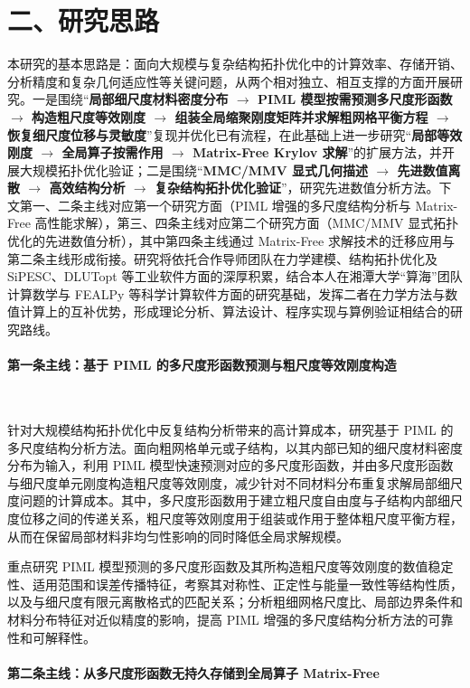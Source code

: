 \documentclass[zihao=-4,a4paper]{ctexart}
\newcommand{\arrowto}{ $\rightarrow$ }
\begin{document}
\section*{二、研究思路}

本研究的基本思路是：面向大规模与复杂结构拓扑优化中的计算效率、存储开销、分析精度和复杂几何适应性等关键问题，从两个相对独立、相互支撑的方面开展研究。一是围绕``\textbf{局部细尺度材料密度分布\arrowto PIML 模型按需预测多尺度形函数\arrowto 构造粗尺度等效刚度\arrowto 组装全局缩聚刚度矩阵并求解粗网格平衡方程\arrowto 恢复细尺度位移与灵敏度}''复现并优化已有流程，在此基础上进一步研究``\textbf{局部等效刚度\arrowto 全局算子按需作用\arrowto Matrix-Free Krylov 求解}''的扩展方法，并开展大规模拓扑优化验证；二是围绕``\textbf{MMC/MMV 显式几何描述\arrowto 先进数值离散\arrowto 高效结构分析\arrowto 复杂结构拓扑优化验证}''，研究先进数值分析方法。下文第一、二条主线对应第一个研究方面（PIML 增强的多尺度结构分析与 Matrix-Free 高性能求解），第三、四条主线对应第二个研究方面（MMC/MMV 显式拓扑优化的先进数值分析），其中第四条主线通过 Matrix-Free 求解技术的迁移应用与第二条主线形成衔接。研究将依托合作导师团队在力学建模、结构拓扑优化及 SiPESC、DLUTopt 等工业软件方面的深厚积累，结合本人在湘潭大学``算海''团队计算数学与 FEALPy 等科学计算软件方面的研究基础，发挥二者在力学方法与数值计算上的互补优势，形成理论分析、算法设计、程序实现与算例验证相结合的研究路线。

\paragraph*{第一条主线：基于 PIML 的多尺度形函数预测与粗尺度等效刚度构造}~

针对大规模结构拓扑优化中反复结构分析带来的高计算成本，研究基于 PIML 的多尺度结构分析方法。面向粗网格单元或子结构，以其内部已知的细尺度材料密度分布为输入，利用 PIML 模型快速预测对应的多尺度形函数，并由多尺度形函数与细尺度单元刚度构造粗尺度等效刚度，减少针对不同材料分布重复求解局部细尺度问题的计算成本。其中，多尺度形函数用于建立粗尺度自由度与子结构内部细尺度位移之间的传递关系，粗尺度等效刚度用于组装或作用于整体粗尺度平衡方程，从而在保留局部材料非均匀性影响的同时降低全局求解规模。

重点研究 PIML 模型预测的多尺度形函数及其所构造粗尺度等效刚度的数值稳定性、适用范围和误差传播特征，考察其对称性、正定性与能量一致性等结构性质，以及与细尺度有限元离散格式的匹配关系；分析粗细网格尺度比、局部边界条件和材料分布特征对近似精度的影响，提高 PIML 增强的多尺度结构分析方法的可靠性和可解释性。

\paragraph*{第二条主线：从多尺度形函数无持久存储到全局算子 Matrix-Free}~
\end{document}
